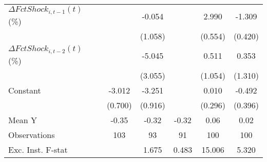 {\begin{tabular}{l*{5}{c}}
\addlinespace
$ \Delta FctShock_{i,t-1}(t)$ (\%)&                     &      -0.054         &                     &       2.990\sym{***}&      -1.309\sym{***}\\
                    &                     &     (1.058)         &                     &     (0.554)         &     (0.420)         \\
\addlinespace
$ \Delta FctShock_{i,t-2}(t)$ (\%)&                     &      -5.045         &                     &       0.511         &       0.353         \\
                    &                     &     (3.055)         &                     &     (1.054)         &     (1.310)         \\
\addlinespace
Constant            &      -3.012\sym{***}&      -3.251\sym{***}&                     &       0.010         &      -0.492         \\
                    &     (0.700)         &     (0.916)         &                     &     (0.296)         &     (0.396)         \\
\midrule
Mean Y              &       -0.35         &       -0.32         &       -0.32         &        0.06         &        0.02         \\
Observations        &         103         &          93         &          91         &         100         &         100         \\
Exc. Inst. F-stat   &                     &       1.675         &       0.483         &      15.006         &       5.320         \\
\bottomrule
\end{tabular}
}
